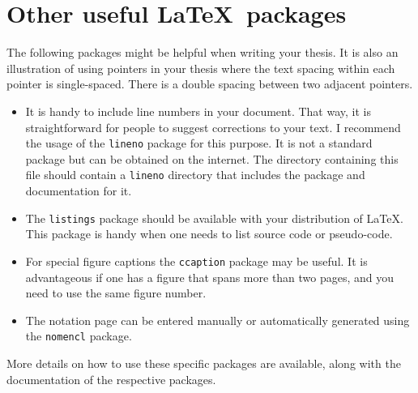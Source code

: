 \section{Other useful \LaTeX\ packages}

The following packages might be helpful when writing your thesis. It is also an illustration of using pointers in your thesis where the text spacing within each pointer is single-spaced. There is a double spacing between two adjacent pointers.

\begin{itemize}  
	\item It is handy to include line numbers in your document. That way, it is straightforward for people to suggest corrections to your text. I recommend the usage of the \texttt{lineno} package for this purpose. It is not a standard package but can be obtained on the internet. The directory containing this file should contain a \verb|lineno| directory that includes the package and documentation for it.
	
	\item The \texttt{listings} package should be available with your
	distribution of \LaTeX.  This package is handy when one needs to list source code or pseudo-code.
	
	\item For special figure captions the \texttt{ccaption} package may be useful.  It is advantageous if one has a figure that spans more than two pages, and you need to use the same figure number.
	
	\item The notation page can be entered manually or automatically generated using the \texttt{nomencl} package.
	
\end{itemize}

More details on how to use these specific packages are available, along
with the documentation of the respective packages.
